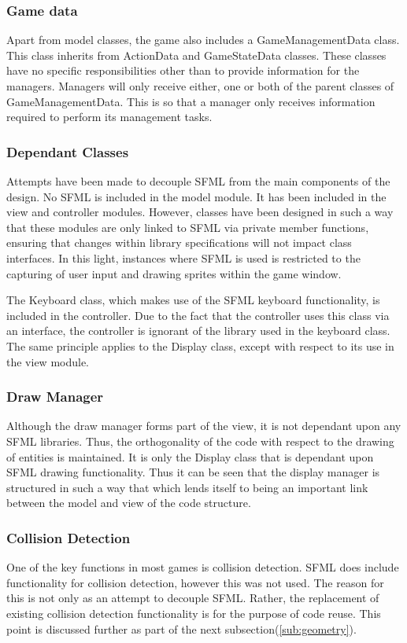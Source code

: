 \documentclass[10pt,twocolumn]{witseiepaper}
\begin{document}
\subsubsection{Game data} Apart from model classes, the game also includes a GameManagementData class. This class inherits from ActionData and GameStateData classes. These classes have no specific responsibilities other than to provide information for the managers. Managers will only receive either, one or both of the parent classes of GameManagementData. This is so that a manager only receives information required to perform its management tasks.

\subsubsection{Dependant Classes}  Attempts have been made to decouple SFML from the main components of the design. No SFML is included in the model module. It has been included in the view and controller modules. However, classes have been designed in such a way that these modules are only linked to SFML via private member functions, ensuring that changes within library specifications will not impact class interfaces. In this light, instances where SFML is used is restricted to the capturing  of user input and drawing sprites within the game window.

The Keyboard class, which makes use of the SFML keyboard functionality, is included in the controller. Due to the fact that the controller uses this class via an interface, the controller is ignorant of the library used in the keyboard class. The same principle applies to the Display class, except with respect to its use in the view module. 

\subsubsection{Draw Manager} Although the draw manager forms part of the view, it is not dependant upon any SFML libraries. Thus, the orthogonality of the code with respect to the drawing of entities is maintained. It is only the Display class that is dependant upon SFML drawing functionality. Thus it can be seen that the display manager is structured in such a way that which lends itself to being an important link between the model and view of the code structure.

\subsubsection{Collision Detection} One of the key functions in most games is collision detection. SFML does include functionality for collision detection, however this was not used. The reason for this is not only as an attempt to decouple SFML. Rather, the replacement of existing collision detection functionality is for the purpose of code reuse. This point is discussed further as part of the next subsection(\ref{sub:geometry}).
\end{document}

